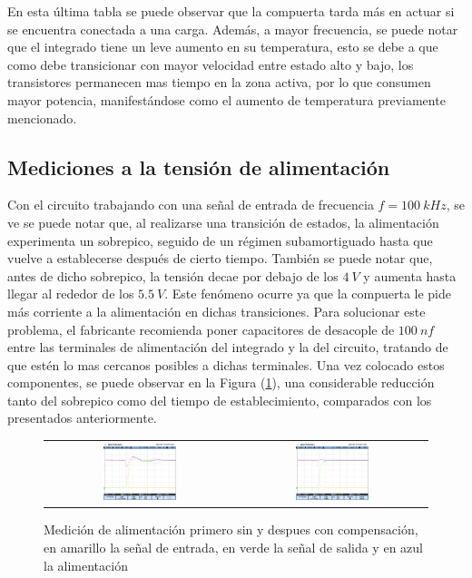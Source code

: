 En esta última tabla se puede observar que la compuerta tarda más en actuar si se encuentra conectada a una carga. Además, a mayor frecuencia, se puede notar que el integrado tiene un leve aumento en su temperatura, esto se debe a que como debe transicionar con mayor velocidad entre estado alto y bajo, los transistores permanecen mas tiempo en la zona activa, por lo que consumen mayor potencia, manifestándose como el aumento de temperatura previamente mencionado.

\subsection{Mediciones a la tensión de alimentación}
Con el circuito trabajando con una señal de entrada de frecuencia $f=100 \ kHz$, se ve se puede notar que, al realizarse una transición de estados, la alimentación experimenta un sobrepico, seguido de un régimen subamortiguado hasta que vuelve a establecerse después de cierto tiempo. También se puede notar que, antes de dicho sobrepico, la tensión decae por debajo de los $4 \ V$ y aumenta hasta llegar al rededor de los $5.5 \ V$. Este fenómeno ocurre ya que la compuerta le pide más corriente a la alimentación en dichas transiciones. Para solucionar este problema, el fabricante recomienda poner capacitores de desacople de $100 \ nf$ entre las terminales de alimentación del integrado y la del circuito, tratando de que estén lo mas cercanos posibles a dichas terminales. Una vez colocado estos componentes, se puede observar en la Figura (\ref{fig:figuramistica}), una considerable reducción tanto del sobrepico como del tiempo de establecimiento, comparados con los presentados anteriormente.
\begin{figure}[H]
    \centering
    \begin{tabular}{c c}
        \includegraphics[width=0.4\textwidth,trim={0 2.2cm 0.1cm 1.75cm},clip]{ImagenesEjercicio4/overshoot.png} &
        \includegraphics[width=0.4\textwidth,trim={0 2.2cm 0.1cm 1.75cm},clip]{ImagenesEjercicio4/overshoot_c.png}
    \end{tabular}
    \caption{Medición de alimentación primero sin y despues con compensación, en amarillo la señal de entrada, en verde la señal de salida y en azul la alimentación}
    \label{fig:figuramistica}
\end{figure}